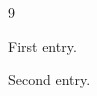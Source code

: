 \documentclass{article}
\begin{document}
\begin{thebibliography}{9}
\item[{[A1]}] First entry.
\item[{[B2]}] Second entry.
\end{thebibliography}
\end{document}
